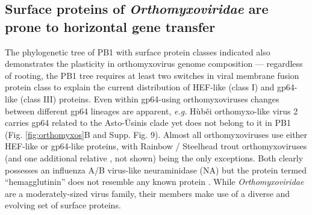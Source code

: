 \documentclass[11pt]{article}
\begin{document}
\subsection{Surface proteins of \textit{Orthomyxoviridae} are prone to horizontal gene transfer}

The phylogenetic tree of PB1 with surface protein classes indicated also demonstrates the plasticity in orthomyxovirus genome composition --- regardless of rooting, the PB1 tree requires at least two switches in viral membrane fusion protein class to explain the current distribution of HEF-like (class I) and gp64-like (class III) proteins.
Even within gp64-using orthomyxoviruses changes between different gp64 lineages are apparent, \textit{e.g.} H\`{u}b\v{e}i orthomyxo-like virus 2 carries gp64 related to the Asto-\={U}sinis clade yet does not belong to it in PB1 (Fig. \ref{fig:orthomyxos}B and Supp. Fig. 9).
Almost all orthomyxoviruses use either HEF-like or gp64-like proteins, with Rainbow / Steelhead trout orthomyxoviruses (and one additional relative \citep{batts_molecular_2017}, not shown) being the only exceptions.
Both clearly possesses an influenza A/B virus-like neuraminidase (NA) but the protein termed ``hemagglutinin'' \citep{batts_molecular_2017} does not resemble any known protein \citep{finn_hmmer_2011}.
While \textit{Orthomyxoviridae} are a moderately-sized virus family, their members make use of a diverse and evolving set of surface proteins.
\end{document}
